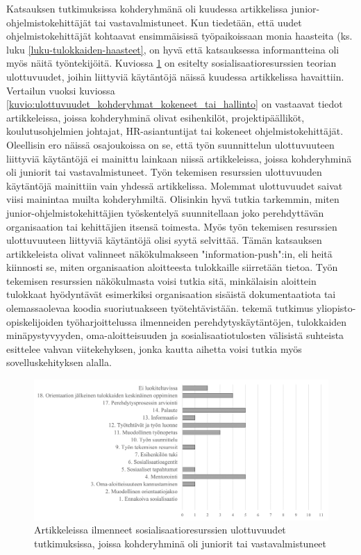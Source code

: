 \documentclass[utf8]{gradu3}
\begin{document}
Katsauksen tutkimuksissa kohderyhmänä oli kuudessa artikkelissa junior-ohjelmistokehittäjät tai vastavalmistuneet. Kun tiedetään, että uudet ohjelmistokehittäjät kohtaavat ensimmäisissä työpaikoissaan monia haasteita (ks. luku \ref{luku-tulokkaiden-haasteet}, on hyvä että katsauksessa informantteina oli myös näitä työntekijöitä. Kuviossa \ref{kuvio:ulottuvuudet_kohderyhmat_juniorit} on esitelty sosialisaatioresurssien teorian ulottuvuudet, joihin liittyviä käytäntöjä näissä kuudessa artikkelissa havaittiin. Vertailun vuoksi kuviossa \ref{kuvio:ulottuvuudet_kohderyhmat_kokeneet_tai_hallinto} on vastaavat tiedot artikkeleissa, joissa kohderyhminä olivat esihenkilöt, projektipäälliköt, koulutusohjelmien johtajat, HR-asiantuntijat tai kokeneet ohjelmistokehittäjät. Oleellisin ero näissä osajoukoissa on se, että työn suunnittelun ulottuvuuteen liittyviä käytäntöjä ei mainittu lainkaan niissä artikkeleissa, joissa kohderyhminä oli juniorit tai vastavalmistuneet. Työn tekemisen resurssien ulottuvuuden käytäntöjä mainittiin vain yhdessä artikkelissa. Molemmat ulottuvuudet saivat viisi mainintaa muilta kohderyhmiltä. Olisinkin hyvä tutkia tarkemmin, miten junior-ohjelmistokehittäjien työskentelyä suunnitellaan joko perehdyttävän organisaation tai kehittäjien itsensä toimesta. Myös työn tekemisen resurssien ulottuvuuteen liittyviä käytäntöjä olisi syytä selvittää. Tämän katsauksen artikkeleista \textcite{yates-ym-2020} olivat valinneet näkökulmakseen "information-push":in, eli heitä kiinnosti se, miten organisaation aloitteesta tulokkaille siirretään tietoa. Työn tekemisen resurssien näkökulmasta voisi tutkia sitä, minkälaisin aloittein tulokkaat hyödyntävät esimerkiksi organisaation sisäistä dokumentaatiota tai olemassaolevaa koodia suoriutuakseen työtehtävistään. \textcite{gruman-ym-2006} tekemä tutkimus yliopisto-opiskelijoiden työharjoittelussa ilmenneiden perehdytyskäytäntöjen, tulokkaiden minäpystyvyyden, oma-aloitteisuuden ja sosialisaatiotulosten välisistä suhteista esittelee vahvan viitekehyksen, jonka kautta aihetta voisi tutkia myös sovelluskehityksen alalla.

\begin{figure}[h]
    \centering
    \includegraphics[width=\textwidth]{media/ulottuvuudet_kohderyhmat_juniorit-tai_vastavalmistuneet.png}
    \caption{Artikkeleissa ilmenneet sosialisaatioresurssien ulottuvuudet tutkimuksissa, joissa kohderyhminä oli juniorit tai vastavalmistuneet}
    \label{kuvio:ulottuvuudet_kohderyhmat_juniorit}
\end{figure}
\end{document}
